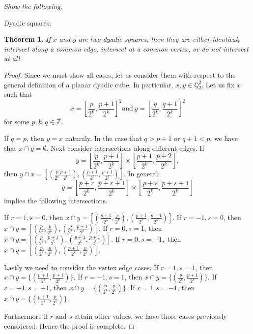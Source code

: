 \documentclass[letter]{article}
\newtheorem{theorem}{Theorem}
\newenvironment{menumerate}{%
  \edef\backupindent{\the\parindent}%
  \enumerate%
  \setlength{\parindent}{\backupindent}%
}{\endenumerate}
\begin{document}
\begin{menumerate}
	\item \textit{Show the following.} 
		\begin{menumerate}
			\item Dyadic squares:
				\begin{theorem}
					 If $x$ and $y$ are two dyadic squares, then they are either identical, intersect along a common edge, intersect at a common vertex, or do not intersect at all.
				\end{theorem}
				\begin{proof}
					Since we must show all cases, let us consider them with respect to the general definition of a planar dyadic cube. In particular, $x,y \in \mathbb{Q}_2^2.$ Let us fix $x$ such that
					$$x = \left[\frac{p}{2^k}, \frac{p+1}{2^k}\right]^2 \mathrm{and}\ y = \left[\frac{q}{2^k}, \frac{q+1}{2^k}\right]^2$$
					for some $p, k, q \in \mathbb{Z}.$

					If $q = p$, then $y = x$ naturaly. In the case that $q > p+1$ or $q+1 < p$, we have that $x \cap y = \emptyset$. Next consider intersections along different edges. If
					 $$y = \left[\frac{p}{2^k}, \frac{p+1}{2^k}\right]\times \left[\frac{p+1}{2^k}, \frac{p+2}{2^k}\right],$$
					 then $y \cap x = [(\frac{p}{2^k}\frac{p+1}{2^k}), (\frac{p+1}{2^k},\frac{p+1}{2^k})]$. In general, 
					 $$y = \left[\frac{p+r}{2^k}, \frac{p+r+1}{2^k}\right]\times \left[\frac{p+s}{2^k}, \frac{p+s+1}{2^k}\right]$$
					 implies the following intersections.

					 If $r = 1, s = 0$, then $x \cap y = \left[(\frac{p+1}{2^k},\frac{p}{2^k}),(\frac{p+1}{2^k}, \frac{p+1}{2^k})\right]$. If $r = -1, s= 0$, then  $x \cap y = \left[(\frac{p}{2^k},\frac{p}{2^k}),(\frac{p}{2^k}, \frac{p+1}{2^k})\right].$ If $r= 0, s = 1$, then  $x \cap y = \left[(\frac{p}{2^k},\frac{p+1}{2^k}),(\frac{p+1}{2^k}, \frac{p+1}{2^k})\right]$. If $r=0,s=-1,$ then  $x \cap y = \left[(\frac{p}{2^k},\frac{p}{2^k}),(\frac{p+1}{2^k}, \frac{p}{2^k})\right]$.

					 Lastly we need to consider the vertex edge cases. If $r =1, s= 1$, then $x \cap y = \{(\frac{p+1}{2^k},\frac{p+1}{2^k})\}$. If $r =-1, s= 1$, then $x \cap y = \{(\frac{p}{2^k},\frac{p+1}{2^k})\}$. If $r =-1, s= -1$, then $x \cap y = \{(\frac{p}{2^k},\frac{p}{2^k})\}$. If $r =1, s= -1$, then $x \cap y = \{(\frac{p+1}{2^k},\frac{p}{2^k})\}$.  

					 Furthermore if $r$ and $s$ attain other values, we have those cases previously considered. Hence the proof is complete.

 				\end{proof}


\end{menumerate}
\end{menumerate}
\end{document}
